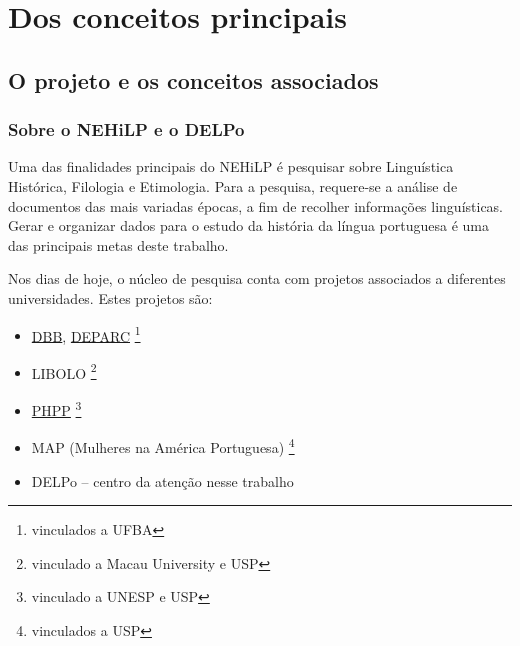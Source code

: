 \chapter{Dos conceitos principais}
\label{cap:main-concepts}
\minitoc


\section{O projeto e os conceitos associados}
\label{sec:project}

\subsection{Sobre o NEHiLP e o DELPo}
\label{subsec:nehilp-delpo}

Uma das finalidades principais do NEHiLP é pesquisar sobre Linguística Histórica,
Filologia e Etimologia. Para a pesquisa, requere-se a análise de documentos das
mais variadas épocas, a fim de recolher informações linguísticas. Gerar e organizar
dados para o estudo da história da língua portuguesa é uma das principais metas
deste trabalho.

Nos dias de hoje, o núcleo de pesquisa conta com projetos associados a diferentes
universidades. Estes projetos são: \begin{itemize}
   \item \href{https://gruponemesis.ufba.br/projetos/dicion\%C3\%A1rio-dialetal-brasileiro}{DBB},
   \href{https://gruponemesis.ufba.br/projetos/dicion\%C3\%A1rio-etimol\%C3\%B3gico-do-portugu\%C3\%AAs-arcaico}{DEPARC}
   \footnote{vinculados a UFBA}
   \item LIBOLO \footnote{vinculado a Macau University e USP}
   \item \href{http://ccint.fflch.usp.br/projeto-de-historia-do-portugues-paulista-phpp-projeto-caipira-2}{PHPP} \footnote{vinculado a UNESP e USP}
   \item MAP (Mulheres na América Portuguesa) \footnote{vinculados a USP}
   \item DELPo -- centro da atenção nesse trabalho
\end{itemize}

